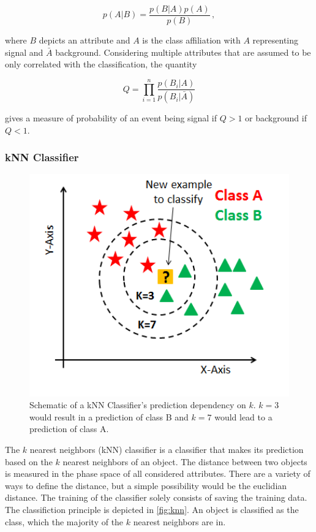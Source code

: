 \begin{equation*}
    p\left(A|B \right) = \frac{p\left(B|A \right) p\left(A \right)}{p\left(B \right)} \, ,
\end{equation*}

where $B$ depicts an attribute and $A$ is the class affiliation with $A$ representing signal and $\bar{A}$ background. Considering multiple attributes that are assumed to be only correlated with the classification, the quantity

\begin{equation*}
    Q = \prod\limits_{i = 1}^{n} \frac{p\left(B_i|A \right)}{p\left(B_i|\bar{A} \right)}
\end{equation*}

gives a measure of probability of an event being signal if $Q > 1$ or background if $Q < 1$.

\subsubsection*{kNN Classifier}

\begin{figure}[tb]
  \centering
  \includegraphics[width=12cm,keepaspectratio]{KNN_final_a1mrv9.png}
  \caption{Schematic of a kNN Classifier's prediction dependency on $k$\cite{knn}. $k=3$ would result in a prediction of class B and $k=7$ would lead to a prediction of class A.}
  \label{fig:knn}
\end{figure}

The $k$ nearest neighbors (kNN) classifier is a classifier that makes its prediction based on the $k$ nearest neighbors of an object. The distance between two objects is measured in the phase space of all considered attributes.
There are a variety of ways to define the distance, but a simple possibility would be the euclidian distance.
The training of the classifier solely consists of saving the training data.
The classifiction principle is depicted in \autoref{fig:knn}.
An object is classified as the class, which the majority of the $k$ nearest neighbors are in.

